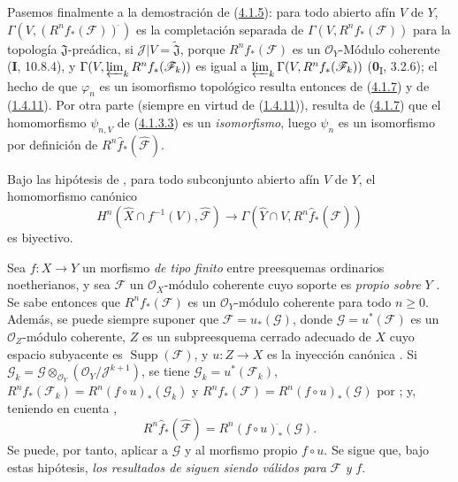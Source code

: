 \begin{env}[4.1.8]
\label{III.4.1.8-fr}
Pasemos finalmente a la demostración de (\hyperref[III.4.1.5-fr]{4.1.5}): para todo abierto afín $V$ de $Y$,
$\Gamma(V,(R^nf_*(\mathcal F))^{\widehat{\,}})$
es la completación separada de
$\Gamma(V,R^nf_*(\mathcal F))$ para la topología
$\mathfrak J$-preádica, si
$\mathcal J|V=\widetilde{\mathfrak J}$, porque
$R^nf_*(\mathcal F)$ es un $\mathcal O_Y$-Módulo coherente (\textbf{I}, 10.8.4),
y $\Gamma(V,\varprojlim_kR^nf_*(\mathcal F_k))$ es igual a
$\varprojlim_k\Gamma(V,R^nf_*(\mathcal F_k))$
(\textbf{0}\textsubscript{I}, 3.2.6); el hecho de que $\varphi_n$ es un isomorfismo topológico resulta entonces de (\hyperref[III.4.1.7-fr]{4.1.7}) y de (\hyperref[III.1.4.11-fr]{1.4.11}). Por otra parte (siempre en virtud de (\hyperref[III.1.4.11-fr]{1.4.11})), resulta de (\hyperref[III.4.1.7-fr]{4.1.7}) que el homomorfismo $\psi_{n,V}$ de
(\hyperref[III.4.1.3.3-fr]{4.1.3.3}) es un \emph{isomorfismo}, luego $\psi_n$
es un isomorfismo por definición de
$R^n\widehat f_*(\widehat{\mathcal F})$.
\end{env}

\begin{corollary}[4.1.9]
\label{III.4.1.9}
\label{III.4.1.9-fr}
Bajo las hipótesis de , para todo subconjunto abierto
afín $V$ de $Y$, el homomorfismo canónico
\[
H^n(\widehat X\cap f^{-1}(V),\widehat{\mathcal F})
\longrightarrow\Gamma(\widehat Y\cap V,
R^n\widehat f_*(\widehat{\mathcal F}))
\]
es biyectivo.
\end{corollary}

\begin{remark}[4.1.10]
\label{III.4.1.10}
\label{III.4.1.10-fr}
Sea $f:X\to Y$ un morfismo \emph{de tipo finito} entre preesquemas ordinarios
noetherianos, y sea $\mathcal F$ un $\mathcal O_X$-módulo coherente cuyo
soporte es \emph{propio sobre} $Y$ .
Se sabe entonces  que $R^nf_*(\mathcal F)$ es un
$\mathcal O_Y$-módulo coherente para todo $n\geq0$. Además, se puede
siempre suponer que $\mathcal F=u_*(\mathcal G)$, donde
$\mathcal G=u^*(\mathcal F)$ es un $\mathcal O_Z$-módulo coherente, $Z$ es un
subpreesquema cerrado adecuado de $X$ cuyo espacio subyacente es
$\operatorname{Supp}(\mathcal F)$, y $u:Z\to X$ es la inyección canónica
.
Si
$\mathcal G_k=\mathcal G\otimes_{\mathcal O_Y}
(\mathcal O_Y/\mathcal J^{k+1})$,
se tiene $\mathcal G_k=u^*(\mathcal F_k)$,
$R^nf_*(\mathcal F_k)=R^n(f\circ u)_*(\mathcal G_k)$ y
$R^nf_*(\mathcal F)=R^n(f\circ u)_*(\mathcal G)$
por ; y, teniendo en cuenta ,
\[
R^n\widehat f_*(\widehat{\mathcal F})
=R^n(f\circ u)^{\widehat{\,}}_*(\mathcal G).
\]
Se puede, por tanto, aplicar  a $\mathcal G$ y al morfismo
propio $f\circ u$.
Se sigue que, bajo estas hipótesis, \emph{los resultados de}
 \emph{siguen siendo válidos para} $\mathcal F$ \emph{y} $f$.
\end{remark}


